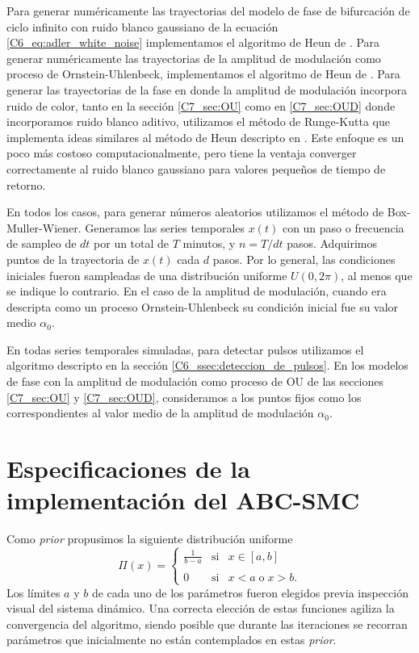 \documentclass[./main.tex]{subfiles}
\begin{document}
\begin{subappendices}
Para generar numéricamente las trayectorias del modelo de fase de bifurcación de ciclo infinito con ruido blanco gaussiano de la ecuación \ref{C6_eq:adler_white_noise} implementamos el algoritmo de Heun de \cite{SanMiguel2000}. Para generar numéricamente las trayectorias de la amplitud de modulación como proceso de Ornstein-Uhlenbeck, implementamos el algoritmo de Heun de \cite{SanMiguel2000}. Para generar las trayectorias de la fase en donde la amplitud de modulación incorpora ruido de color, tanto en la sección \ref{C7_sec:OU} como en \ref{C7_sec:OUD} donde incorporamos ruido blanco aditivo, utilizamos el método de Runge-Kutta que implementa ideas similares al método de Heun descripto en \cite{SanMiguel2000}. Este enfoque es un poco más costoso computacionalmente, pero tiene la ventaja converger correctamente al ruido blanco gaussiano para valores pequeños de tiempo de retorno.


En todos los casos, para generar números aleatorios utilizamos el método de Box-Muller-Wiener. Generamos las series temporales $x(t)$ con un paso o frecuencia de sampleo de $dt$ por un total de $T$ minutos, y $n = T/dt $ pasos. Adquirimos puntos de la trayectoria de $x(t)$ cada $d$ pasos. Por lo general, las condiciones iniciales fueron sampleadas de una distribución uniforme $U(0,2\pi)$, al menos que se indique lo contrario. En el caso de la amplitud de modulación, cuando era descripta como un proceso Ornstein-Uhlenbeck su condición inicial fue su valor medio $\alpha_0$.


En todas series temporales simuladas, para detectar pulsos utilizamos el algoritmo descripto en la sección \ref{C6_ssec:deteccion_de_pulsos}. En los modelos de fase con la amplitud de modulación como proceso de OU de las secciones \ref{C7_sec:OU} y \ref{C7_sec:OUD}, consideramos a los puntos fijos como los correspondientes al valor medio de la amplitud de modulación $\alpha_0$.



\chapter{Especificaciones de la implementación del ABC-SMC}
\label{C6_ap:ABC-SMC}
\label{C7_ap:ABC-SMC}

Como \textit{prior} propusimos la siguiente distribución uniforme
\begin{equation*}
    \Pi(x) = \left\{ \begin{array}{lcc}
             \frac{1}{b-a} &   \text{si}  & x \in [a,b] \\
             \\ 0 &  \text{si} & x < a \; \text{o} \; x > b.
             \end{array}
   \right.
\end{equation*}
Los límites $a$ y $b$ de cada uno de los parámetros fueron elegidos previa inspección visual del sistema dinámico. Una correcta elección de estas funciones agiliza la convergencia del algoritmo, siendo posible que durante las iteraciones se recorran parámetros que inicialmente no están contemplados en estas \textit{prior}. 


\end{subappendices}
\end{document}
